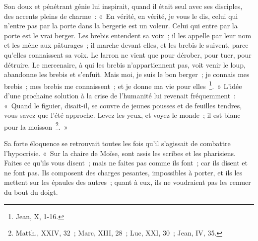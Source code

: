 \documentclass[french,twoside]{book} %
\begin{document}
Son doux et pénétrant génie lui inspirait, quand il était seul avec ses disciples, des accents pleins de charme : « En vérité, en vérité, je vous le dis, celui qui n’entre pas par la porte dans la bergerie est un voleur. Celui qui entre par la porte est le vrai berger. Les brebis entendent sa voix ; il les appelle par leur nom et les mène aux pâturages ; il marche devant elles, et les brebis le suivent, parce qu’elles connaissent sa voix. Le larron ne vient que pour dérober, pour tuer, pour détruire. Le mercenaire, à qui les brebis n’appartiennent pas, voit venir le loup, abandonne les brebis et s’enfuit. Mais moi, je suis le bon berger ; je connais mes brebis ; mes brebis me connaissent ; et je donne ma vie pour elles \footnote{Jean, X, 1-16.}. » L’idée d’une prochaine solution à la crise de l’humanité lui revenait fréquemment : « Quand le figuier, disait-il, se couvre de jeunes pousses et de feuilles tendres, vous savez que l’été approche. Levez les yeux, et voyez le monde ; il est blanc pour la moisson \footnote{Matth., XXIV, 32 ; Marc, XIII, 28 ; Luc, XXI, 30 ; Jean, IV, 35.}. »\par
Sa forte éloquence se retrouvait toutes les fois qu’il s’agissait de combattre l’hypocrisie. « Sur la chaire de Moïse, sont assis les scribes et les pharisiens. Faites ce qu’ils vous disent ; mais ne faites pas comme ils font ; car ils disent et ne font pas. Ils composent des charges pesantes, impossibles à porter, et ils les mettent sur les épaules des autres ; quant à eux, ils ne voudraient pas les remuer du bout du doigt.\par
\end{document}
